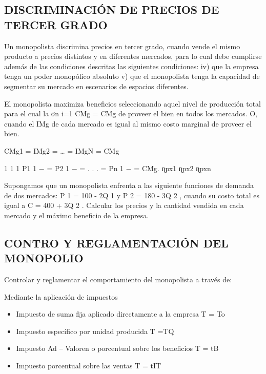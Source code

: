 \documentclass[
  letterpaper,
  DIV=11,
  numbers=noendperiod]{scrartcl}
\begin{document}
\hypertarget{discriminaciuxf3n-de-precios-de-tercer-grado}{%
\subsection{DISCRIMINACIÓN DE PRECIOS DE TERCER
GRADO}\label{discriminaciuxf3n-de-precios-de-tercer-grado}}

Un monopolista discrimina precios en tercer grado, cuando vende el mismo
producto a precios distintos y en diferentes mercados, para lo cual debe
cumplirse además de las condiciones descritas las siguientes
condiciones: iv) que la empresa tenga un poder monopólico absoluto v)
que el monopolista tenga la capacidad de segmentar su mercado en
escenarios de espacios diferentes.

El monopolista maximiza beneficios seleccionando aquel nivel de
producción total para el cual la σn i=1 CMg = CMg de proveer el bien en
todos los mercados. O, cuando el IMg de cada mercado es igual al mismo
costo marginal de proveer el bien.

CMg1 = IMg2 = \ldots{} = IMgN = CMg

1 1 1 P1 1 − = P2 1 − = . . . = Pn 1 − = CMg. ɳpx1 ɳpx2 ɳpxn

Supongamos que un monopolista enfrenta a las siguiente funciones de
demanda de dos mercados: P 1 = 100 - 2Q 1 y P 2 = 180 - 3Q 2 , cuando su
costo total es igual a C = 400 + 3Q 2 . Calcular los precios y la
cantidad vendida en cada mercado y el máximo beneficio de la empresa.

\hypertarget{contro-y-reglamentaciuxf3n-del-monopolio}{%
\subsection{CONTRO Y REGLAMENTACIÓN DEL
MONOPOLIO}\label{contro-y-reglamentaciuxf3n-del-monopolio}}

Controlar y reglamentar el comportamiento del monopolista a través de:

Mediante la aplicación de impuestos

\begin{itemize}
\item
  Impuesto de suma fija aplicado directamente a la empresa T = To
\item
  Impuesto específico por unidad producida T =TQ
\item
  Impuesto Ad -- Valoren o porcentual sobre los beneficios T = tB
\item
  Impuesto porcentual sobre las ventas T = tIT
\end{itemize}
\end{document}
